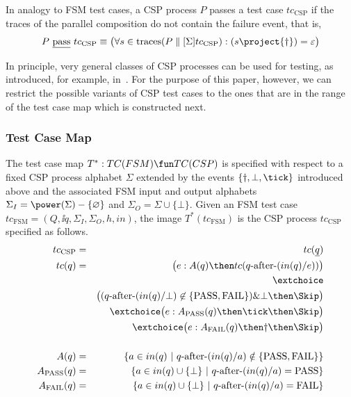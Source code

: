  In analogy to FSM test cases, a CSP process $P$ passes a test case $tc_\text{CSP}$
 if the traces of the parallel composition do not contain the failure event, that is,
 $$
 P\ \pass\ tc_\text{CSP} \equiv \big(
 \forall s\in\trc(P\parallel[\Sigma] tc_\text{CSP}): (s\project \{\dag\}) = \varepsilon
 \big)
 $$


 In principle, very general classes of CSP processes can be
 used for testing, as introduced, for example,
 in~\cite{DBLP:conf/fm/PeleskaS96,peleska1997a}. For the purpose of this paper, however, we can restrict the possible variants of CSP test cases to the ones that are in the range of the test case map which is constructed next.


\subsubsection*{Test Case Map}

The test case map $T^* :TC(FSM) \fun TC(CSP)$ is specified with respect to a fixed
CSP process alphabet $\Sigma$ extended by the events $\{\dag,\bot,\tick \}$ introduced
above
and the associated FSM input and output alphabets
$\Sigma_I = \power(\Sigma)-\{\varnothing\}$ and $\Sigma_O=\Sigma\cup \{\bot \}$.
Given an FSM test case $tc_\text{FSM}=(Q,\ii q,\Sigma_I,\Sigma_O,h,in)$,
the image $T^*(tc_\text{FSM})$ is the CSP process $tc_\text{CSP}$ specified
as follows.
\begin{eqnarray*}
tc_\text{CSP} & = & tc(\ii q)
\\
tc(q) & = & \big( e :  A(q) \then  tc(q\after (in(q)/e)) \big)
\\ & & \extchoice
\\ & & \big((q\after(in(q)/\bot)\not\in \{\text{PASS},\text{FAIL}\}) \& \bot\then \Skip\big)
\\ & & \extchoice
 \big( e : A_\text{PASS}(q)   \then \tick \then \Skip \big)
\\ & & \extchoice
 \big( e : A_\text{FAIL}(q) \then \dag \then \Skip \big)
\\ & &
\\
A(q) & = & \{ a\in in(q)~|~q\after (in(q)/a)\notin \{\text{PASS},\text{FAIL}\} \}
\\
A_\text{PASS}(q) & = & \{ a\in in(q)\cup\{\bot\}~|~q\after(in(q)/a) = \text{PASS} \}
\\
A_\text{FAIL}(q) & = & \{ a\in in(q)\cup\{\bot\}~|~q\after(in(q)/a) = \text{FAIL} \}
\end{eqnarray*}


